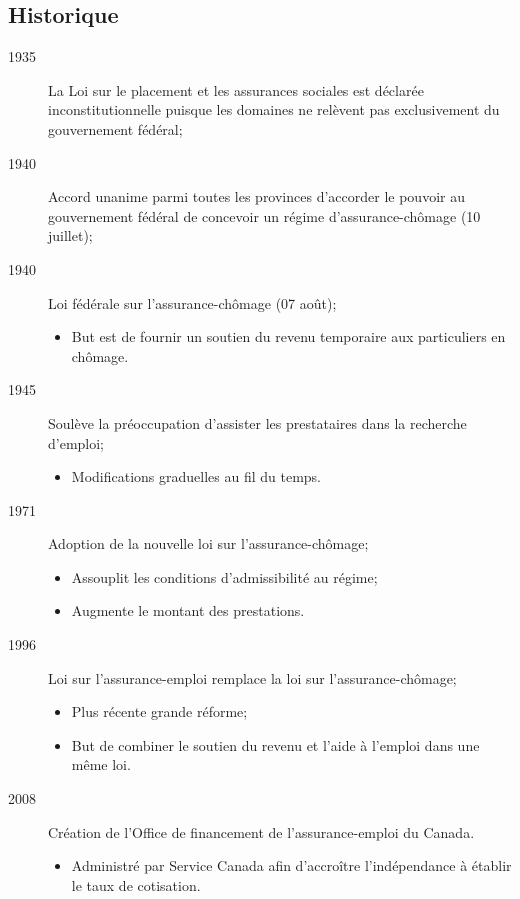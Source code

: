 \documentclass[10pt, french]{article}
\begin{document}
\begin{multicols*}{3}
\subsection*{Historique}
\begin{description}
	\item[1935]	La Loi sur le placement et les assurances sociales est déclarée inconstitutionnelle puisque les domaines ne relèvent pas exclusivement du gouvernement fédéral;
	\item[1940]	Accord unanime parmi toutes les provinces d'accorder le pouvoir au gouvernement fédéral de concevoir un régime d'assurance-chômage (10 juillet);
	\item[1940]	Loi \textcolor{bulgarianrose}{fédérale} sur l'assurance-chômage (07 août);
		\begin{itemize}[leftmargin =*]
		\item	But est de fournir un soutien du revenu temporaire aux particuliers en chômage.
		\end{itemize}
	\item[1945]	Soulève la préoccupation d'assister les prestataires dans la recherche d'emploi;
		\begin{itemize}[leftmargin =*]
		\item	Modifications graduelles au fil du temps.
		\end{itemize}
	\item[1971]	Adoption de la nouvelle loi sur l'assurance-chômage;
		\begin{itemize}[leftmargin =*]
		\item	Assouplit les conditions d'admissibilité au régime;
		\item	Augmente le montant des prestations.
		\end{itemize}
	\item[1996]	Loi sur l'assurance-emploi remplace la loi sur l'assurance-chômage;
		\begin{itemize}[leftmargin =*]
		\item	Plus récente grande réforme;
		\item	But de combiner le soutien du revenu et l'aide à l'emploi dans une même loi.
		\end{itemize}
	\item[2008]	Création de l'Office de financement de l'assurance-emploi du Canada.
		\begin{itemize}[leftmargin =*]
		\item	Administré par Service Canada afin d'accroître l'indépendance à établir le taux de cotisation.
		\end{itemize}
\end{description}


\end{multicols*}
\end{document}
